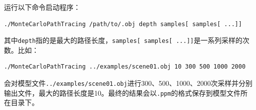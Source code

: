 \documentclass[10pt,a4paper]{article}
\begin{document}
运行以下命令启动程序：
\begin{lstlisting}
./MonteCarloPathTracing /path/to/.obj depth samples[ samples[ ...]]
\end{lstlisting}

其中\lstinline!depth!指的是最大的路径长度，\lstinline!samples[ samples[ ...]]!是一系列采样的次数。比如：
\begin{lstlisting}
./MonteCarloPathTracing ../examples/scene01.obj 10 300 500 1000 2000
\end{lstlisting}
会对模型文件\lstinline!../examples/scene01.obj!进行300、500、1000、2000次采样并分别输出文件，最大的路径长度是10。最终的结果会以\lstinline!.ppm!的格式保存到模型文件所在目录下。
\end{document}
